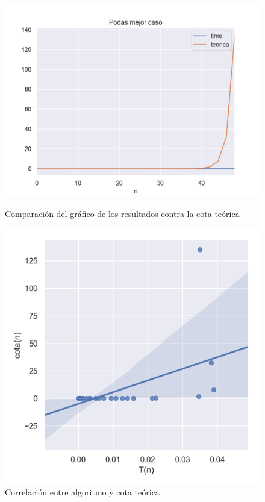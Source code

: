 \begin{figure}[!htb]
   \begin{minipage}{0.6\textwidth}
     \centering
     \includegraphics[width=1\linewidth]{img/mejor_Figure_1}
     \caption{Comparación del gráfico de los resultados contra la cota teórica}
   \end{minipage}\hfill
   \begin{minipage}{0.6\textwidth}
     \centering
     \includegraphics[width=1\linewidth]{img/mejor_Figure_2}
     \caption{Correlación entre algoritmo y cota teórica}
   \end{minipage}
\end{figure}

